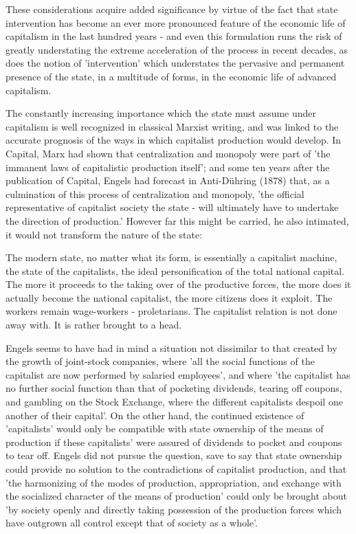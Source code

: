These considerations acquire added significance by virtue of the fact that state intervention has become an ever more pronounced feature of the economic life of capitalism in the last hundred years - and even this formulation runs the risk of greatly understating the extreme acceleration of the process in recent decades, as does the notion of 'intervention' which understates the pervasive and permanent presence of the state, in a multitude of forms, in the economic life of advanced capitalism.

The constantly increasing importance which the state must assume under capitalism is well recognized in classical Marxist writing, and was linked to the accurate prognosis of the ways in which capitalist production would develop. In Capital, Marx had shown that centralization and monopoly were part of 'the immanent laws of capitalistic production itself'; and some ten years after the publication of Capital, Engels had forecast in Anti-Dühring (1878) that, as a culmination of this process of centralization and monopoly, 'the official representative of capitalist society the state - will ultimately have to undertake the direction of production.' However far this might be carried, he also intimated, it would not transform the nature of the state:
\begin{displayquote}
    The modern state, no matter what its form, is essentially a capitalist machine, the state of the capitalists, the ideal personification of the total national capital. The more it proceeds to the taking over of the productive forces, the more does it actually become the national capitalist, the more citizens does it exploit. The workers remain wage-workers -  proletarians. The capitalist relation is not done away with. It is rather brought to a head.
\end{displayquote}

Engels seems to have had in mind a situation not dissimilar to that created by the growth of joint-stock companies, where 'all the social functions of the capitalist are now performed by salaried employees', and where 'the capitalist has no further social function than that of pocketing dividends, tearing off coupons, and gambling on the Stock Exchange, where the different capitalists despoil one another of their capital'. On the other hand, the continued existence of 'capitalists' would only be compatible with state ownership of the means of production if these capitalists' were assured of dividends to pocket and coupons to tear off. Engels did not pursue the question, save to say that state ownership could provide no solution to the contradictions of capitalist production, and that 'the harmonizing of the modes of production, appropriation, and exchange with the socialized character of the means of production' could only be brought about 'by society openly and directly taking possession of the production forces which have outgrown all control except that of society as a whole'.

